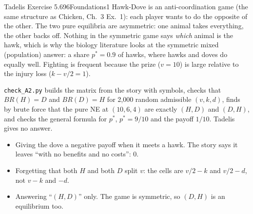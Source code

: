 \begin{exsol}{Tadelis Exercise 5.6}{96}{Foundations}{1}
\interp Hawk-Dove is an anti-coordination game (the same structure as Chicken, \MG{} Ch.~3
Ex.~1): each player wants to do the opposite of the other. The two pure equilibria are
asymmetric: one animal takes everything, the other backs off. Nothing in the symmetric game says
\emph{which} animal is the hawk, which is why the biology literature looks at the symmetric mixed
(population) answer: a share $p^* = 0.9$ of hawks, where hawks and doves do equally well.
Fighting is frequent because the prize ($v = 10$) is large relative to the injury loss
($k - v/2 = 1$).

\verify \texttt{check\_A2.py} builds the matrix from the story with symbols, checks that
$BR(H) = D$ and $BR(D) = H$ for 2{,}000 random admissible $(v,k,d)$, finds by brute force that the
pure NE at $(10,6,4)$ are exactly $(H,D)$ and $(D,H)$, and checks the general formula for $p^*$,
$p^* = 9/10$ and the payoff $1/10$. Tadelis gives no answer.

\mistakes
\begin{itemize}
  \item Giving the dove a negative payoff when it meets a hawk. The story says it leaves ``with no
  benefits and no costs'': $0$.
  \item Forgetting that both $H$ and both $D$ split $v$: the cells are $v/2 - k$ and $v/2 - d$, not
  $v - k$ and $-d$.
  \item Answering ``$(H,D)$'' only. The game is symmetric, so $(D,H)$ is an equilibrium too.
\end{itemize}

\end{exsol}
